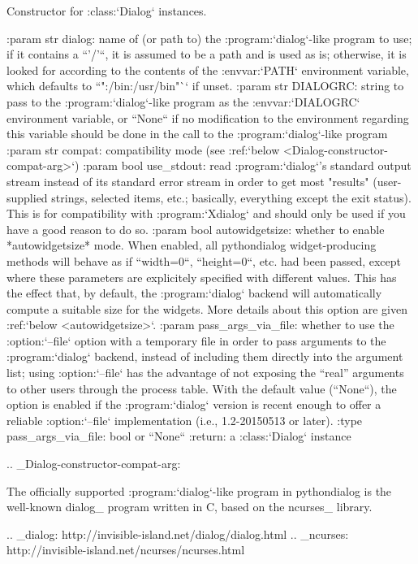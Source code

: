 \begin{DoxyVerb}Constructor for :class:`Dialog` instances.

:param str dialog:
  name of (or path to) the :program:`dialog`-like program to
  use; if it contains a ``'/'``, it is assumed to be a path and
  is used as is; otherwise, it is looked for according to the
  contents of the :envvar:`PATH` environment variable, which
  defaults to ``":/bin:/usr/bin"`` if unset.
:param str DIALOGRC:
  string to pass to the :program:`dialog`-like program as the
  :envvar:`DIALOGRC` environment variable, or ``None`` if no
  modification to the environment regarding this variable should
  be done in the call to the :program:`dialog`-like program
:param str compat:
  compatibility mode (see :ref:`below
  <Dialog-constructor-compat-arg>`)
:param bool use_stdout:
  read :program:`dialog`'s standard output stream instead of its
  standard error stream in order to get most "results"
  (user-supplied strings, selected items, etc.; basically,
  everything except the exit status). This is for compatibility
  with :program:`Xdialog` and should only be used if you have a
  good reason to do so.
:param bool autowidgetsize:
  whether to enable *autowidgetsize* mode. When enabled, all
  pythondialog widget-producing methods will behave as if
  ``width=0``, ``height=0``, etc. had been passed, except where
  these parameters are explicitely specified with different
  values. This has the effect that, by default, the
  :program:`dialog` backend will automatically compute a
  suitable size for the widgets. More details about this option
  are given :ref:`below <autowidgetsize>`.
:param pass_args_via_file:
  whether to use the :option:`--file` option with a temporary
  file in order to pass arguments to the :program:`dialog`
  backend, instead of including them directly into the argument
  list; using :option:`--file` has the advantage of not exposing
  the “real” arguments to other users through the process table.
  With the default value (``None``), the option is enabled if
  the :program:`dialog` version is recent enough to offer a
  reliable :option:`--file` implementation (i.e., 1.2-20150513
  or later).
:type pass_args_via_file: bool or ``None``
:return: a :class:`Dialog` instance

.. _Dialog-constructor-compat-arg:

The officially supported :program:`dialog`-like program in
pythondialog is the well-known dialog_ program written in C,
based on the ncurses_ library.

.. _dialog: http://invisible-island.net/dialog/dialog.html
.. _ncurses: http://invisible-island.net/ncurses/ncurses.html


\end{DoxyVerb}
